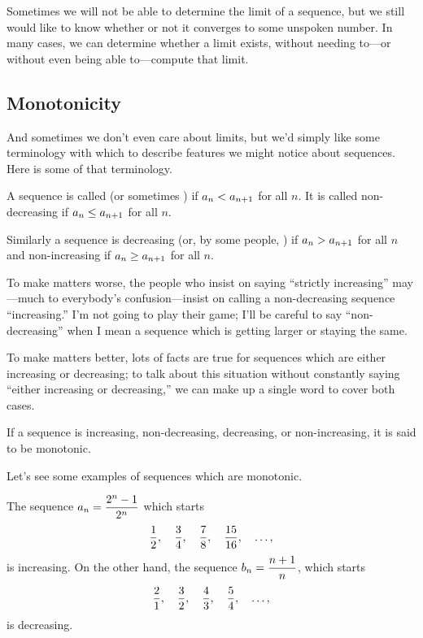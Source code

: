 Sometimes we will not be able to determine the limit of a sequence,
but we still would like to know whether or not it converges to some
unspoken number.  In many cases, we can determine whether a limit
exists, without needing to---or without even being able to---compute
that limit.

\subsection{Monotonicity}
\label{subsection:monotonicity}

And sometimes we don't even care about limits, but we'd simply like
some terminology with which to describe features we might notice about
sequences.  Here is some of that terminology.


\begin{definition}
  A sequence is called
   (or sometimes
  ) if $\displaystyle a_n<a_{n+1}$ for all $n$.
  It is called {\dfont
    non-decreasing\/} if $\displaystyle a_n\le
  a_{n+1}$ for all $n$.

  Similarly a sequence is {\dfont
    decreasing\/} (or, by some people,
  ) if $\displaystyle a_n>a_{n+1}$ for all $n$ and
  {\dfont non-increasing\/} if $\displaystyle
  a_n\ge a_{n+1}$ for all $n$.
\end{definition}
To make matters worse, the people who insist on saying ``strictly
increasing'' may---much to everybody's confusion---insist on calling a
non-decreasing sequence ``increasing.'' I'm not going to play their
game; I'll be careful to say ``non-decreasing'' when I mean a sequence
which is getting larger or staying the same.

To make matters better, lots of facts are true for sequences which are
either increasing or decreasing; to talk about this situation without
constantly saying ``either increasing or decreasing,'' we can make up
a single word to cover both cases.
\begin{definition}
  If a sequence is increasing, non-decreasing, decreasing, or
  non-increasing, it is said to be {\dfont
    monotonic\/}.
\end{definition}

Let's see some examples of sequences which are monotonic.
\begin{example}
The sequence $\displaystyle a_n = {2^n-1\over2^n}$ which starts
$$
  {1\over2},\quad {3\over4},\quad {7\over8},\quad {15\over16},\quad \ldots,
$$
is increasing.  On the other hand, the sequence $\displaystyle b_n = {n+1\over n}$, which starts
$$ 
  {2\over1},\quad{3\over2},\quad{4\over3},\quad{5\over4},\quad\ldots,
$$
is decreasing.
\end{example}

